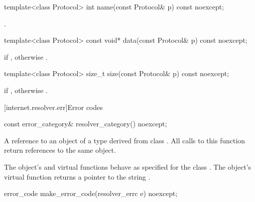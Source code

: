 \begin{itemdecl}
template<class Protocol> int name(const Protocol& p) const noexcept;
\end{itemdecl}

\begin{itemdescr}
\pnum
\returns {}.
\end{itemdescr}

\begin{itemdecl}
template<class Protocol> const void* data(const Protocol& p) const noexcept;
\end{itemdecl}

\begin{itemdescr}
\pnum
\returns {} if , otherwise .
\end{itemdescr}

\begin{itemdecl}
template<class Protocol> size_t size(const Protocol& p) const noexcept;
\end{itemdecl}

\begin{itemdescr}
\pnum
\returns {} if , otherwise .
\end{itemdescr}




%
[internet.resolver.err]{Error codes}

%
\begin{itemdecl}
const error_category& resolver_category() noexcept;
\end{itemdecl}

\begin{itemdescr}
\pnum
\returns A reference to an object of a type derived from class . All calls to this function return references to the same object.

\pnum
The object's  and  virtual functions behave as specified for the class . The object's  virtual function returns a pointer to the string .
\end{itemdescr}

%
%
\begin{itemdecl}
error_code make_error_code(resolver_errc e) noexcept;
\end{itemdecl}

